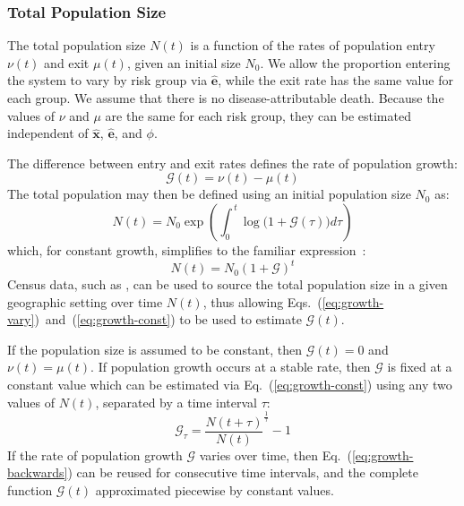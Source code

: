 \subsubsection{Total Population Size}
\label{aaa:params-nu-mu}
The total population size $N(t)$ is a function of
the rates of population entry $\nu(t)$ and exit $\mu(t)$, given an initial size $N_0$.
We allow the proportion entering the system to vary by risk group via $\bm{\hat{e}}$,
while the exit rate has the same value for each group.
We assume that there is no disease-attributable death.
Because the values of $\nu$ and $\mu$ are the same for each risk group, 
they can be estimated independent of
$\bm{\hat{x}}$, $\bm{\hat{e}}$, and $\phi$.
\par
The difference between entry and exit rates
defines the rate of population growth:
\begin{equation}\label{eq:growth-G}
\mathcal{G}(t) = \nu(t) - \mu(t) 
\end{equation}
The total population may then be defined using an initial population size $N_0$ as:
\begin{equation}\label{eq:growth-vary}
N(t) = N_0 \exp{\left(\int_{0}^{\,t}{\log\big(1+\mathcal{G}(\tau) \big)d\tau}\right)}
\end{equation}
which, for constant growth, simplifies to the familiar expression~\citep{Malthus1798}:
\begin{equation}\label{eq:growth-const}
N(t) = N_0 {(1 + \mathcal{G})}^{t}
\end{equation}
Census data, such as \citep{WorldBank}, can be used to source
the total population size in a given geographic setting over time $N(t)$,
thus allowing Eqs.~(\ref{eq:growth-vary})~and~(\ref{eq:growth-const})
to be used to estimate $\mathcal{G}(t)$.
\par
If the population size is assumed to be constant,
then $\mathcal{G}(t) = 0$ and $\nu(t) = \mu(t)$.
If population growth occurs at a stable rate, then
$\mathcal{G}$ is fixed at a constant value
which can be estimated via Eq.~(\ref{eq:growth-const})
using any two values of $N(t)$, separated by a time interval $\tau$:
\begin{equation}\label{eq:growth-backwards}
\mathcal{G}_{\tau} = {\frac{N(t+\tau)}{N(t)}}^{\frac{1}{\tau}} -1
\end{equation}
If the rate of population growth $\mathcal{G}$ varies over time,
then Eq.~(\ref{eq:growth-backwards}) can be reused for consecutive time intervals,
and the complete function $\mathcal{G}(t)$ approximated piecewise by constant values.
